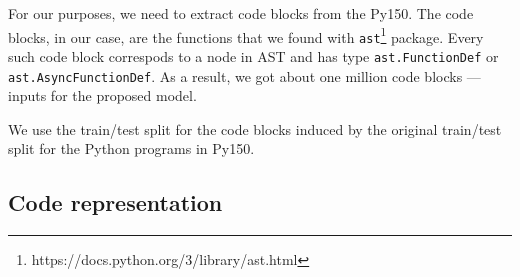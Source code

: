 \documentclass[conference]{ieeetran}
\begin{document}
For our purposes, we need to extract code blocks from the Py150.
The code blocks, in our case, are the functions that we found with \texttt{ast}\footnote{https://docs.python.org/3/library/ast.html} package.
Every such code block correspods to a node in AST and has type \texttt{ast.FunctionDef} or \texttt{ast.AsyncFunctionDef}.
As a result, we got about one million code blocks --- inputs for the proposed model.

We use the train/test split for the code blocks induced by the original train/test split for the Python programs in Py150.


\subsection{Code representation}\label{representation}
\end{document}
